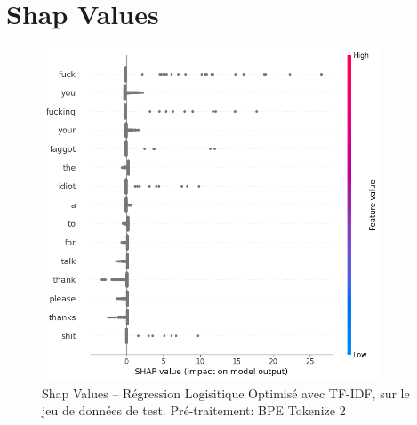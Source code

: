 \section{Shap Values}
\begin{figure}[h]
    \centering
    \includegraphics[width=0.9\textwidth]{figures/reg-tf-shap.png}
    \caption{Shap Values – Régression Logisitique Optimisé avec TF-IDF, sur le jeu de données de test. Pré-traitement: BPE Tokenize 2}
\end{figure}